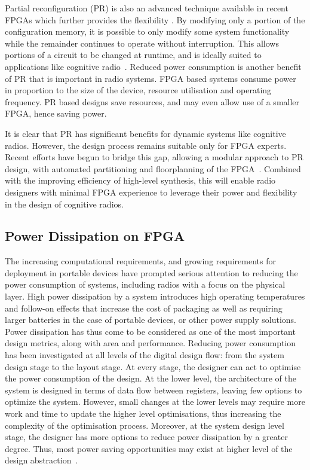 Partial reconfiguration (PR) is also an advanced technique available in recent FPGAs which further provides the flexibility \cite{Sedcole2006,McDonald2008}.
By modifying only a portion of the configuration memory, it is possible to only modify some system functionality while the remainder continues to operate without interruption.
This allows portions of a circuit to be changed at runtime, and is ideally suited to applications like cognitive radio~\cite{Delahaye2007,Delorme2008}.
Reduced power consumption is another benefit of PR that is important in radio systems.
FPGA based systems consume power in proportion to the size of the device, resource utilisation and operating frequency.
PR based designs save resources, and may even allow use of a smaller FPGA, hence saving power.

It is clear that PR has significant benefits for dynamic systems like cognitive radios.
However, the design process remains suitable only for FPGA experts.
Recent efforts have begun to bridge this gap, allowing a modular approach to PR design, with automated partitioning and floorplanning of the FPGA~\cite{Vipin2012,Vipin2013}.
Combined with the improving efficiency of high-level synthesis, this will enable radio designers with minimal FPGA experience to leverage their power and flexibility in the design of cognitive radios.

\subsection{Power Dissipation on FPGA}
The increasing computational requirements, and growing requirements for deployment in portable devices have prompted serious attention to reducing the power consumption of systems, including radios with a focus on the physical layer.
High power dissipation by a system introduces high operating temperatures and follow-on effects that increase the cost of packaging as well as requiring larger batteries in the case of portable devices, or other power supply solutions.
Power dissipation has thus come to be considered as one of the most important design metrics, along with area and performance.
Reducing power consumption has been investigated at all levels of the digital design flow: from the system design stage to the layout stage.
At every stage, the designer can act to optimise the power consumption of the design.
At the lower level, the architecture of the system is designed in terms of data flow between registers, leaving few options to optimize the system.
However, small changes at the lower levels may require more work and time to update the higher level optimisations, thus increasing the complexity of the optimisation process.
Moreover, at the system design level stage, the designer has more options to reduce power dissipation by a greater degree.
Thus, most power saving opportunities may exist at higher level of the design abstraction~\cite{Raghunathan1998}.

